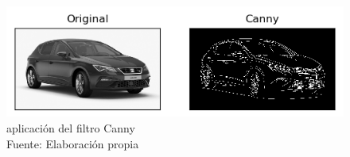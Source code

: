         \begin{figure}[H]
            \centering
            \includegraphics[scale=0.55]{imagenes/canny}
            \caption{aplicación del filtro Canny\\ Fuente: Elaboración propia}
        \end{figure}

